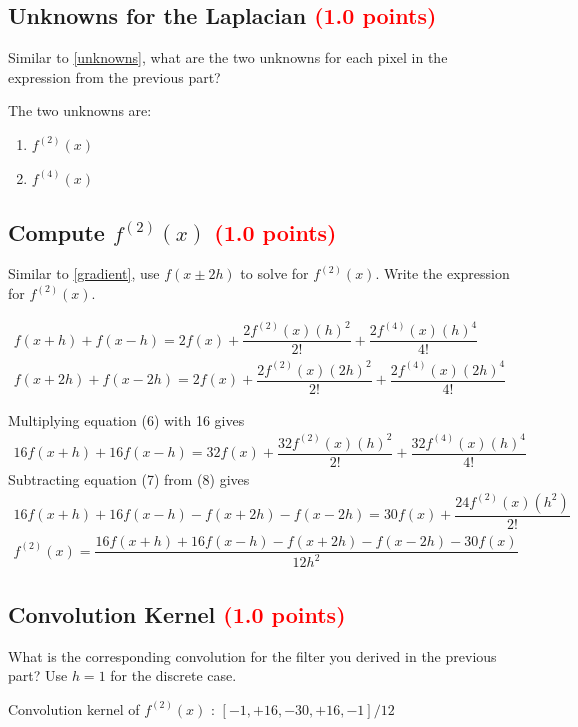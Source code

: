 \documentclass[answers]{exam}
\newcommand{\mypoints}[1]{\textcolor{red}{(#1 points)}}
\begin{document}
\subsection{Unknowns for the Laplacian \mypoints{1.0}}
Similar to \ref{unknowns}, what are the two unknowns for each pixel in the expression from the previous part?
\begin{solution}
The two unknowns are:
\begin{enumerate}
  \item $f^{(2)}(x)$
  \item $f^{(4)}(x)$
\end{enumerate}
\end{solution}

\subsection{Compute $f^{(2)}(x)$ \mypoints{1.0}}
Similar  to \ref{gradient}, use $f(x \pm 2h)$ to solve for $f^{(2)}(x)$. Write the expression for $f^{(2)}(x)$.
\begin{solution}
\begin{align}
f(x+h) + f(x-h) = 2f(x) + \dfrac{2f^{(2)}(x)(h)^2}{2!} + \dfrac{2f^{(4)}(x)(h)^4}{4!}\\
f(x+2h) + f(x-2h) = 2f(x) + \dfrac{2f^{(2)}(x)(2h)^2}{2!} + \dfrac{2f^{(4)}(x)(2h)^4}{4!}
\end{align} 

Multiplying equation (6) with 16 gives 
\begin{align}
16f(x+h) + 16f(x-h) = 32f(x) + \dfrac{32f^{(2)}(x)(h)^2}{2!} + \dfrac{32f^{(4)}(x)(h)^4}{4!}
\end{align} 
Subtracting equation (7) from (8) gives
\begin{align}
16f(x+h) + 16f(x-h) - f(x+2h) - f(x-2h)= 30f(x) + \dfrac{24f^{(2)}(x)(h^2)}{2!}\\
f^{(2)}(x) = \dfrac{16f(x+h) + 16f(x-h) - f(x+2h) - f(x-2h) - 30f(x)}{12h^2}
\end{align} 
\end{solution}

\subsection{Convolution Kernel \mypoints{1.0}}
What is the corresponding convolution for the filter you derived in the previous part? Use $h=1$ for the discrete case.
\begin{solution}
Convolution kernel of $f^{(2)}(x)$ :
$[-1, +16, -30, +16, -1]/12$
\end{solution}
\end{document}
